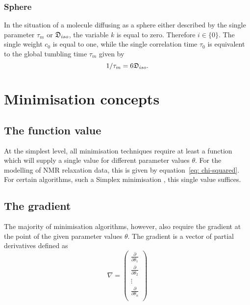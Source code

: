 \subsubsection{Sphere}
In the situation of a molecule diffusing as a sphere  either described by the single parameter $\tau_m$ or $\mathfrak{D}_{iso}$, the variable $k$ is equal to zero.  Therefore $i \in \{0\}$.  The single weight $c_0$ is equal to one, while the single correlation time $\tau_0$ is equivalent to the global tumbling time $\tau_m$ given by
\begin{equation} \label{eq: sphere tau0}
 1/\tau_m = 6\mathfrak{D}_{iso}.
\end{equation}







\section{Minimisation concepts}

\subsection{The function value}

At the simplest level, all minimisation techniques require at least a function which will supply a single value for different parameter values $\theta$.  For the modelling of NMR relaxation data, this is given by equation~\eqref{eq: chi-squared}.  For certain algorithms, such a Simplex minimisation , this single value suffices.


\subsection{The gradient}

The majority of minimisation algorithms, however, also require the gradient at the point of the given parameter values $\theta$.  The gradient is a vector of partial derivatives defined as
\begin{equation}
 \nabla = \begin{pmatrix}
  \frac{\partial}{\partial \theta_1} \\
  \frac{\partial}{\partial \theta_2} \\
  \vdots \\
  \frac{\partial}{\partial \theta_n} \\
 \end{pmatrix}
\end{equation}


